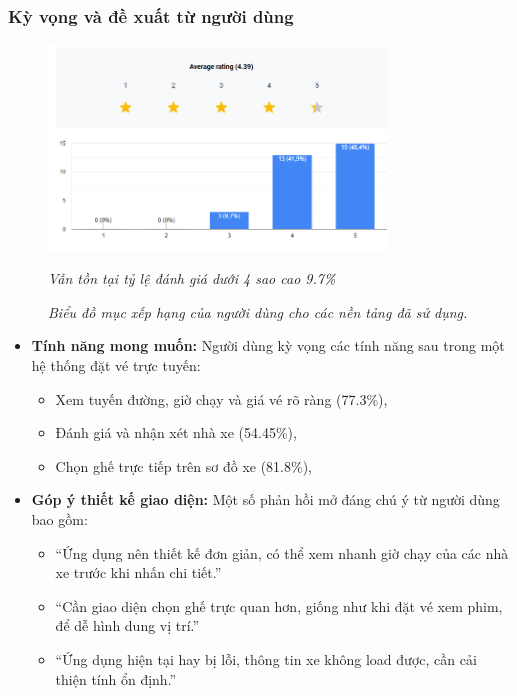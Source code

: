 \subsubsection{Kỳ vọng và đề xuất từ người dùng}
\begin{figure}[h]
    \centering
    \includegraphics[width=0.8\textwidth]{assets/chart/1.4.7.png}
    \caption{\textit{Biểu đồ mục xếp hạng của người dùng cho các nền tảng đã sử dụng.}} \textit{ Vẫn tồn tại tỷ lệ đánh giá dưới 4 sao cao 9.7\%}
    \label{fig:muc_dich}
\end{figure}
\begin{itemize}
    \item \textbf{Tính năng mong muốn:} Người dùng kỳ vọng các tính năng sau trong một hệ thống đặt vé trực tuyến:
    \begin{itemize}
        \item Xem tuyến đường, giờ chạy và giá vé rõ ràng (77.3\%),
        \item Đánh giá và nhận xét nhà xe (54.45\%),
        \item Chọn ghế trực tiếp trên sơ đồ xe (81.8\%),
    \end{itemize}
    \item \textbf{Góp ý thiết kế giao diện:} Một số phản hồi mở đáng chú ý từ người dùng bao gồm:
    \begin{itemize}
        \item ``Ứng dụng nên thiết kế đơn giản, có thể xem nhanh giờ chạy của các nhà xe trước khi nhấn chi tiết.''
        \item ``Cần giao diện chọn ghế trực quan hơn, giống như khi đặt vé xem phim, để dễ hình dung vị trí.''
        \item ``Ứng dụng hiện tại hay bị lỗi, thông tin xe không load được, cần cải thiện tính ổn định.''
    \end{itemize}
\end{itemize}


